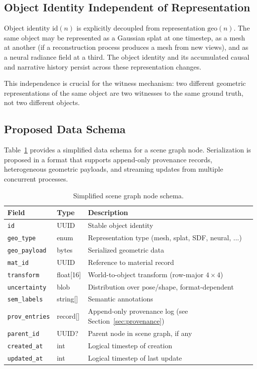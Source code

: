 \documentclass[11pt,a4paper]{article}
\theoremstyle{plain}
\theoremstyle{definition}
\theoremstyle{remark}
\begin{document}
\subsection{Object Identity Independent of Representation}

Object identity $\mathrm{id}(n)$ is explicitly decoupled from representation $\mathrm{geo}(n)$. The same object may be represented as a Gaussian splat at one timestep, as a mesh at another (if a reconstruction process produces a mesh from new views), and as a neural radiance field at a third. The object identity and its accumulated causal and narrative history persist across these representation changes.

This independence is crucial for the witness mechanism: two different geometric representations of the same object are two witnesses to the same ground truth, not two different objects.

\subsection{Proposed Data Schema}

Table~\ref{tab:schema} provides a simplified data schema for a scene graph node. Serialization is proposed in a format that supports append-only provenance records, heterogeneous geometric payloads, and streaming updates from multiple concurrent processes.

\begin{table}[h]
\centering
\caption{Simplified scene graph node schema.}
\label{tab:schema}
\begin{tabular}{lll}
\toprule
Field & Type & Description \\
\midrule
\texttt{id} & UUID & Stable object identity \\
\texttt{geo\_type} & enum & Representation type (mesh, splat, SDF, neural, ...) \\
\texttt{geo\_payload} & bytes & Serialized geometric data \\
\texttt{mat\_id} & UUID & Reference to material record \\
\texttt{transform} & float[16] & World-to-object transform (row-major $4\times4$) \\
\texttt{uncertainty} & blob & Distribution over pose/shape, format-dependent \\
\texttt{sem\_labels} & string[] & Semantic annotations \\
\texttt{prov\_entries} & record[] & Append-only provenance log (see Section~\ref{sec:provenance}) \\
\texttt{parent\_id} & UUID? & Parent node in scene graph, if any \\
\texttt{created\_at} & int & Logical timestep of creation \\
\texttt{updated\_at} & int & Logical timestep of last update \\
\bottomrule
\end{tabular}
\end{table}
\end{document}
